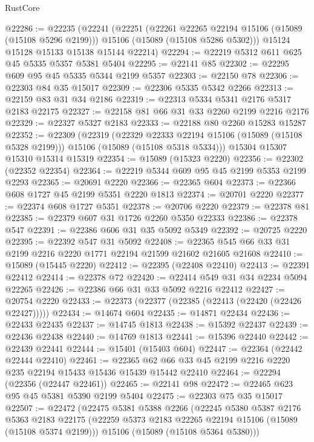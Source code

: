 \begin{lexlean}{RustCore}
\begin{coremodule}
@22286 := @22235
    (@22241
      (@22251
        (@22261 @22265 @22194 @15106 (@15089 (@15108 @5296 @2199)))
        @15106
        (@15089 (@15108 @5286 @5302)))
      @15124
      @15128
      @15133
      @15138
      @15144
      @22214)
@22294 := @22219 @5312 @611 @625 @45 @5335 @5357 @5381 @5404
@22295 := @22141 @85
@22302 := @22295 @609 @95 @45 @5335 @5344 @2199 @5357
@22303 := @22150 @78
@22306 := @22303 @84 @35 @15017
@22309 := @22306 @5335 @5342 @2266
@22313 := @22159 @83 @31 @34 @2186
@22319 := @22313 @5334 @5341 @2176 @5317 @2183 @22175
@22327 := @22158 @81 @66 @31 @33 @2260 @2199 @2216 @2176
@22329 := @22327 @5327 @2183
@22333 := @22188 @80 @2260 @15283 @15287
@22352 := @22309
    (@22319
      (@22329 @22333 @22194 @15106 (@15089 (@15108 @5328 @2199)))
      @15106
      (@15089 (@15108 @5318 @5334)))
    @15304
    @15307
    @15310
    @15314
    @15319
@22354 := @15089 (@15323 @2220)
@22356 := @22302 (@22352 @22354)
@22364 := @22219 @5344 @609 @95 @45 @2199 @5353 @2199 @2293
@22365 := @20691 @2220
@22366 := @22365 @604
@22373 := @22366 @608 @1727 @45 @2199 @5351 @2220 @1813
@22374 := @20701 @2220
@22377 := @22374 @608 @1727 @5351
@22378 := @20706 @2220
@22379 := @22378 @81
@22385 := @22379 @607 @31 @1726 @2260 @5350 @22333
@22386 := @22378 @547
@22391 := @22386 @606 @31 @35 @5092 @5349
@22392 := @20725 @2220
@22395 := @22392 @547 @31 @5092
@22408 := @22365 @545 @66 @33 @31 @2199 @2216 @2220 @1771 @22194 @21599 @21602 @21605 @21608
@22410 := @15089 (@15445 @2220)
@22412 := @22395 (@22408 @22410)
@22413 := @22391 @22412
@22414 := @22378 @72
@22420 := @22414 @549 @31 @34 @2234 @5094 @22265
@22426 := @22386 @66 @31 @33 @5092 @2216 @22412
@22427 := @20754 @2220
@22433 := @22373 (@22377 (@22385 (@22413 (@22420 (@22426 @22427)))))
@22434 := @14674 @604
@22435 := @14871 @22434
@22436 := @22433 @22435
@22437 := @14745 @1813
@22438 := @15392 @22437
@22439 := @22436 @22438
@22440 := @14769 @1813
@22441 := @15396 @22440
@22442 := @22439 @22441
@22444 := @15401 (@15403 @604)
@22447 := @22364 (@22442 @22444 @22410)
@22461 := @22365 @62 @66 @33 @45 @2199 @2216 @2220 @235 @22194 @15433 @15436 @15439 @15442 @22410
@22464 := @22294 (@22356 (@22447 @22461))
@22465 := @22141 @98
@22472 := @22465 @623 @95 @45 @5381 @5390 @2199 @5404
@22475 := @22303 @75 @35 @15017
@22507 := @22472
    (@22475
      @5381
      @5388
      @2266
      (@22245
        @5380
        @5387
        @2176
        @5363
        @2183
        @22175
        (@22259 @5373 @2183 @22265 @22194 @15106 (@15089 (@15108 @5374 @2199)))
        @15106
        (@15089 (@15108 @5364 @5380)))

\end{coremodule}
\end{lexlean}
